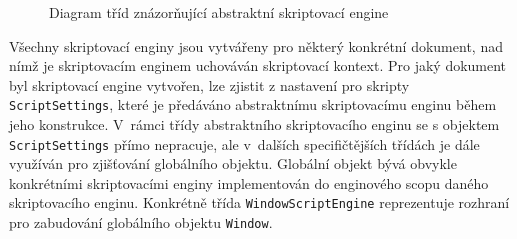 \begin{figure}[H]
  \begin{center}
    \caption{Diagram tříd znázorňující abstraktní skriptovací engine}
    \label{Figure.BrowserScriptEngine}
  \end{center}
\end{figure}

\vspace{-1em}

Všechny skriptovací enginy jsou vytvářeny pro některý konkrétní dokument, nad nímž je skriptovacím enginem uchováván skriptovací kontext. Pro jaký dokument byl skriptovací engine vytvořen, lze zjistit z nastavení pro skripty \texttt{ScriptSettings}, které je předáváno abstraktnímu skriptovacímu enginu během jeho konstrukce. V~rámci třídy abstraktního skriptovacího enginu se s objektem \texttt{ScriptSettings} přímo nepracuje, ale v~dalších specifičtějších třídách je dále využíván pro zjišťování globálního objektu. Globální objekt bývá obvykle konkrétními skriptovacími enginy implementován do enginového scopu daného skriptovacího enginu. Konkrétně třída \texttt{WindowScriptEngine} reprezentuje rozhraní pro zabudování globálního objektu \texttt{Window}.

